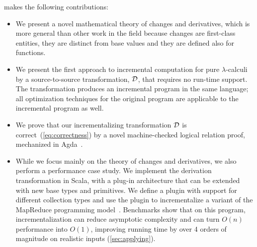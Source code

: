  makes the following contributions:
\begin{itemize}
\item We present a novel mathematical theory of changes and derivatives, which
  is more general than other work in the field because changes are first-class
  entities, they are distinct from base values and they are defined also for
  functions.
%
\item We present the first approach to incremental computation for pure
  $\lambda$-calculi by a source-to-source transformation, $\mathcal{D}$, that
  requires no run-time support. The transformation produces an incremental
  program in the same language; all optimization techniques for the original
  program are applicable to the incremental program as well.
%
%
\item We prove that our incrementalizing transformation $\mathcal{D}$
is correct~(\cref{eq:correctness}) by a novel machine-checked logical relation
proof, mechanized in Agda~\citep{agda-head}.

\item While we focus mainly on the theory of changes
and derivatives, we also perform a performance case study.
We implement the derivation transformation in Scala,
with a plug-in architecture that can be extended with new base
types and primitives. We define a plugin with support for
different collection types and use the plugin to
incrementalize a variant of the MapReduce programming model~\citep{Lammel07}.
  Benchmarks show that on this program,
  incrementalization can reduce asymptotic complexity and can turn $O(n)$
  performance into $O(1)$, improving running time by over 4
  orders of magnitude on realistic inputs (\cref{sec:applying}).
\end{itemize}

